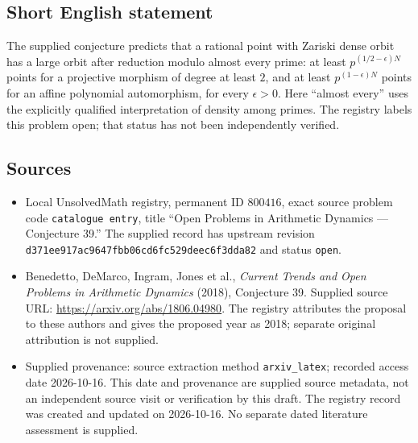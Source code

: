 \documentclass[11pt]{article}
\begin{document}
\subsection{Short English statement}
The supplied conjecture predicts that a rational point with Zariski dense orbit has a large orbit after reduction modulo almost every prime: at least \(p^{(1/2-\epsilon)N}\) points for a projective morphism of degree at least \(2\), and at least \(p^{(1-\epsilon)N}\) points for an affine polynomial automorphism, for every \(\epsilon>0\). Here ``almost every'' uses the explicitly qualified interpretation of density among primes. The registry labels this problem open; that status has not been independently verified.
\subsection{Sources}
\begin{itemize}
\item Local UnsolvedMath registry, permanent ID \(800416\), exact source problem code \texttt{catalogue entry}, title ``Open Problems in Arithmetic Dynamics --- Conjecture 39.'' The supplied record has upstream revision \texttt{d371ee917ac9647fbb06cd6fc529deec6f3dda82} and status \texttt{open}.
\item Benedetto, DeMarco, Ingram, Jones et al., \emph{Current Trends and Open Problems in Arithmetic Dynamics} (2018), Conjecture 39. Supplied source URL: \url{https://arxiv.org/abs/1806.04980}. The registry attributes the proposal to these authors and gives the proposed year as 2018; separate original attribution is not supplied.
\item Supplied provenance: source extraction method \texttt{arxiv\_latex}; recorded access date 2026-10-16. This date and provenance are supplied source metadata, not an independent source visit or verification by this draft. The registry record was created and updated on 2026-10-16. No separate dated literature assessment is supplied.
\end{itemize}
\end{document}
